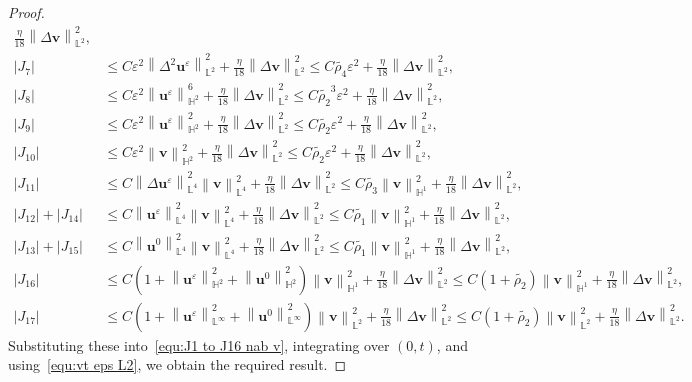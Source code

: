 \documentclass[10pt,a4paper]{amsart}
\newcommand{\abs}[1]{\left|{#1}\right|}
\newcommand{\bb}{\mathbb}
\newcommand{\bff}{\boldsymbol}
\newcommand{\norm}[2]{\left\|{#1}\right\|_{#2}}
\begin{document}
\begin{proof}
\begin{align*}
    \frac{\eta}{18} \norm{\Delta \bff{v}}{\bb{L}^2}^2,
    \\
    \abs{J_7}
    &\leq
    C\varepsilon^2  \norm{\Delta^2 \bff{u}^\varepsilon}{\bb{L}^2}^2
    +
    \frac{\eta}{18} \norm{\Delta \bff{v}}{\bb{L}^2}^2
    \leq
    C\widetilde{\rho_4} \varepsilon^2
    +
    \frac{\eta}{18} \norm{\Delta \bff{v}}{\bb{L}^2}^2,
    \\
    \abs{J_8}
    &\leq
    C\varepsilon^2 \norm{\bff{u}^\varepsilon}{\bb{H}^2}^6
    +
    \frac{\eta}{18} \norm{\Delta \bff{v}}{\bb{L}^2}^2
    \leq
    C\widetilde{\rho_2}^3 \varepsilon^2
    +
    \frac{\eta}{18} \norm{\Delta \bff{v}}{\bb{L}^2}^2,
    \\
    \abs{J_9}
    &\leq
    C\varepsilon^2 \norm{\bff{u}^\varepsilon}{\bb{H}^2}^2
    +
    \frac{\eta}{18} \norm{\Delta \bff{v}}{\bb{L}^2}^2
    \leq
    C\widetilde{\rho_2} \varepsilon^2
    +
    \frac{\eta}{18} \norm{\Delta \bff{v}}{\bb{L}^2}^2,
    \\
    \abs{J_{10}}
    &\leq
    C\varepsilon^2 \norm{\bff{v}}{\bb{H}^2}^2
    +
    \frac{\eta}{18} \norm{\Delta \bff{v}}{\bb{L}^2}^2
    \leq
    C\widetilde{\rho_2} \varepsilon^2
    +
    \frac{\eta}{18} \norm{\Delta \bff{v}}{\bb{L}^2}^2,
    \\
    \abs{J_{11}}
    &\leq
    C \norm{\Delta \bff{u}^\varepsilon}{\bb{L}^4}^2 \norm{\bff{v}}{\bb{L}^4}^2
    +
    \frac{\eta}{18} \norm{\Delta \bff{v}}{\bb{L}^2}^2
    \leq
    C\widetilde{\rho_3} \norm{\bff{v}}{\bb{H}^1}^2 
    +
    \frac{\eta}{18} \norm{\Delta \bff{v}}{\bb{L}^2}^2,
    \\
    \abs{J_{12}} + \abs{J_{14}}
    &\leq
    C \norm{\bff{u}^\varepsilon}{\bb{L}^4}^2 \norm{\bff{v}}{\bb{L}^4}^2
    +
    \frac{\eta}{18} \norm{\Delta \bff{v}}{\bb{L}^2}^2
    \leq
    C \widetilde{\rho_1} \norm{\bff{v}}{\bb{H}^1}^2
    +
    \frac{\eta}{18} \norm{\Delta \bff{v}}{\bb{L}^2}^2,
    \\
    \abs{J_{13}} + \abs{J_{15}}
    &\leq
    C\norm{\bff{u}^0}{\bb{L}^4}^2 \norm{\bff{v}}{\bb{L}^4}^2
    +
    \frac{\eta}{18} \norm{\Delta \bff{v}}{\bb{L}^2}^2
    \leq
    C \widetilde{\rho_1} \norm{\bff{v}}{\bb{H}^1}^2
    +
    \frac{\eta}{18} \norm{\Delta \bff{v}}{\bb{L}^2}^2,
    \\
    \abs{J_{16}}
    &\leq
    C\left(1+\norm{\bff{u}^\varepsilon}{\bb{H}^2}^2 + \norm{\bff{u}^0}{\bb{H}^2}^2 \right) \norm{\bff{v}}{\bb{H}^1}^2
    +
    \frac{\eta}{18} \norm{\Delta \bff{v}}{\bb{L}^2}^2
    \leq
    C\left(1+\widetilde{\rho_2} \right) \norm{\bff{v}}{\bb{H}^1}^2
    +
    \frac{\eta}{18} \norm{\Delta \bff{v}}{\bb{L}^2}^2,
    \\
    \abs{J_{17}}
    &\leq
    C\left(1+\norm{\bff{u}^\varepsilon}{\bb{L}^\infty}^2 + \norm{\bff{u}^0}{\bb{L}^\infty}^2 \right) \norm{\bff{v}}{\bb{L}^2}^2
    +
    \frac{\eta}{18} \norm{\Delta \bff{v}}{\bb{L}^2}^2
    \leq
    C\left(1+\widetilde{\rho_2} \right) \norm{\bff{v}}{\bb{L}^2}^2
    +
    \frac{\eta}{18} \norm{\Delta \bff{v}}{\bb{L}^2}^2.
\end{align*}
Substituting these into~\eqref{equ:J1 to J16 nab v}, integrating over $(0,t)$, and using~\eqref{equ:vt eps L2}, we obtain the required result.
\end{proof}
\end{document}
